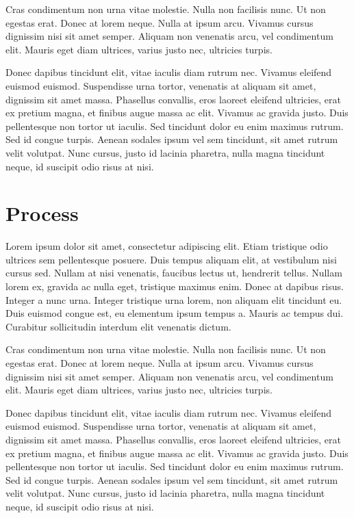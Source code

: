 \documentclass[11pt, a4paper]{JTH}
\begin{document}
Cras condimentum non urna vitae molestie. Nulla non facilisis nunc. Ut non egestas erat. Donec at lorem neque. Nulla at ipsum arcu. Vivamus cursus dignissim nisi sit amet semper. Aliquam non venenatis arcu, vel condimentum elit. Mauris eget diam ultrices, varius justo nec, ultricies turpis.

Donec dapibus tincidunt elit, vitae iaculis diam rutrum nec. Vivamus eleifend euismod euismod. Suspendisse urna tortor, venenatis at aliquam sit amet, dignissim sit amet massa. Phasellus convallis, eros laoreet eleifend ultricies, erat ex pretium magna, et finibus augue massa ac elit. Vivamus ac gravida justo. Duis pellentesque non tortor ut iaculis. Sed tincidunt dolor eu enim maximus rutrum. Sed id congue turpis. Aenean sodales ipsum vel sem tincidunt, sit amet rutrum velit volutpat. Nunc cursus, justo id lacinia pharetra, nulla magna tincidunt neque, id suscipit odio risus at nisi.

\section{Process}

Lorem ipsum dolor sit amet, consectetur adipiscing elit. Etiam tristique odio ultrices sem pellentesque posuere. Duis tempus aliquam elit, at vestibulum nisi cursus sed. Nullam at nisi venenatis, faucibus lectus ut, hendrerit tellus. Nullam lorem ex, gravida ac nulla eget, tristique maximus enim. Donec at dapibus risus. Integer a nunc urna. Integer tristique urna lorem, non aliquam elit tincidunt eu. Duis euismod congue est, eu elementum ipsum tempus a. Mauris ac tempus dui. Curabitur sollicitudin interdum elit venenatis dictum.

Cras condimentum non urna vitae molestie. Nulla non facilisis nunc. Ut non egestas erat. Donec at lorem neque. Nulla at ipsum arcu. Vivamus cursus dignissim nisi sit amet semper. Aliquam non venenatis arcu, vel condimentum elit. Mauris eget diam ultrices, varius justo nec, ultricies turpis.

Donec dapibus tincidunt elit, vitae iaculis diam rutrum nec. Vivamus eleifend euismod euismod. Suspendisse urna tortor, venenatis at aliquam sit amet, dignissim sit amet massa. Phasellus convallis, eros laoreet eleifend ultricies, erat ex pretium magna, et finibus augue massa ac elit. Vivamus ac gravida justo. Duis pellentesque non tortor ut iaculis. Sed tincidunt dolor eu enim maximus rutrum. Sed id congue turpis. Aenean sodales ipsum vel sem tincidunt, sit amet rutrum velit volutpat. Nunc cursus, justo id lacinia pharetra, nulla magna tincidunt neque, id suscipit odio risus at nisi.
\end{document}
